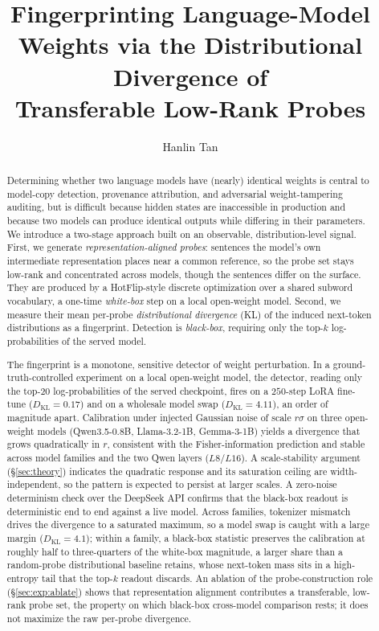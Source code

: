 \documentclass[11pt]{article}
\title{\bf Fingerprinting Language-Model Weights via the Distributional Divergence of\\ Transferable Low-Rank Probes}
\author{Hanlin Tan}
\date{}
\theoremstyle{definition}
\begin{document}
\maketitle

\begin{abstract}
Determining whether two language models have (nearly) identical weights is
central to model-copy detection, provenance attribution, and adversarial
weight-tampering auditing, but is difficult because hidden states are
inaccessible in production and because two models can produce identical outputs
while differing in their parameters. We introduce a two-stage approach built on
an observable, distribution-level signal. First, we generate
\emph{representation-aligned probes}: sentences the model's own intermediate
representation places near a common reference, so the probe set stays low-rank
and concentrated across models, though the sentences differ on the surface.
They are produced by a HotFlip-style discrete
optimization over a shared subword vocabulary, a one-time \emph{white-box} step
on a local open-weight model. Second, we measure their mean per-probe
\emph{distributional divergence} (KL) of the induced next-token distributions
as a fingerprint. Detection is \emph{black-box}, requiring only the top-$k$
log-probabilities of the served model.

The fingerprint is a monotone, sensitive detector of weight perturbation. In a
ground-truth-controlled experiment on a local open-weight model, the detector,
reading only the top-$20$ log-probabilities of the served checkpoint, fires on
a $250$-step LoRA fine-tune ($D_{\mathrm{KL}} = 0.17$) and on a wholesale model
swap ($D_{\mathrm{KL}} = 4.11$), an order of magnitude apart. Calibration under
injected Gaussian noise of scale $r\sigma$ on three open-weight models
(Qwen3.5-0.8B, Llama-3.2-1B, Gemma-3-1B) yields a divergence that grows
quadratically in $r$, consistent with the Fisher-information prediction and
stable across model families and the two Qwen layers ($L8$/$L16$). A
scale-stability argument (\S\ref{sec:theory}) indicates the quadratic response
and its saturation ceiling are width-independent, so the pattern is expected to
persist at larger scales. A zero-noise
determinism check over the DeepSeek API confirms that the black-box readout is
deterministic end to end against a live model.
Across families, tokenizer mismatch drives the divergence to a
saturated maximum, so a model swap is caught with a large margin
($D_{\mathrm{KL}}=4.1$); within a family, a black-box statistic preserves the
calibration at roughly half to three-quarters of the white-box magnitude, a
larger share than a random-probe distributional baseline retains, whose
next-token mass sits in a high-entropy tail that the top-$k$ readout
discards.
An ablation of the probe-construction role (\S\ref{sec:exp:ablate}) shows that
representation alignment contributes a transferable, low-rank probe set, the
property on which black-box cross-model comparison rests; it does not maximize
the raw per-probe divergence.
\end{abstract}
\end{document}
